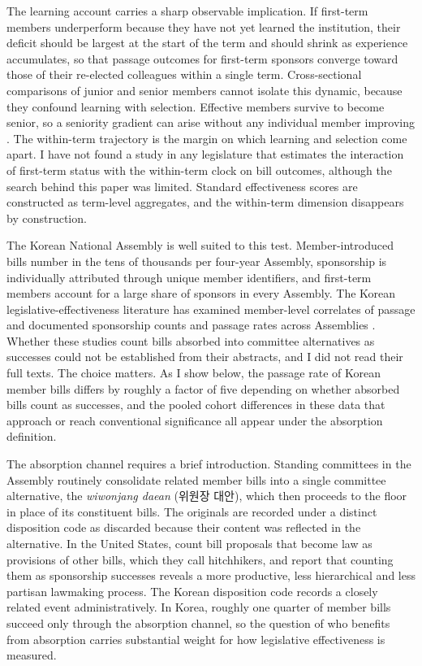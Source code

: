 \documentclass[11pt]{article}
\begin{document}
The learning account carries a sharp observable implication. If first-term members underperform because they have not yet learned the institution, their deficit should be largest at the start of the term and should shrink as experience accumulates, so that passage outcomes for first-term sponsors converge toward those of their re-elected colleagues within a single term. Cross-sectional comparisons of junior and senior members cannot isolate this dynamic, because they confound learning with selection. Effective members survive to become senior, so a seniority gradient can arise without any individual member improving \citep{padroimiquel2006}. The within-term trajectory is the margin on which learning and selection come apart. I have not found a study in any legislature that estimates the interaction of first-term status with the within-term clock on bill outcomes, although the search behind this paper was limited. Standard effectiveness scores are constructed as term-level aggregates, and the within-term dimension disappears by construction.

The Korean National Assembly is well suited to this test. Member-introduced bills number in the tens of thousands per four-year Assembly, sponsorship is individually attributed through unique member identifiers, and first-term members account for a large share of sponsors in every Assembly. The Korean legislative-effectiveness literature has examined member-level correlates of passage \citep{an2025, jeong2016} and documented sponsorship counts and passage rates across Assemblies \citep{ka2025a}. Whether these studies count bills absorbed into committee alternatives as successes could not be established from their abstracts, and I did not read their full texts. The choice matters. As I show below, the passage rate of Korean member bills differs by roughly a factor of five depending on whether absorbed bills count as successes, and the pooled cohort differences in these data that approach or reach conventional significance all appear under the absorption definition.

The absorption channel requires a brief introduction. Standing committees in the Assembly routinely consolidate related member bills into a single committee alternative, the \textit{wiwonjang daean} (위원장 대안), which then proceeds to the floor in place of its constituent bills. The originals are recorded under a distinct disposition code as discarded because their content was reflected in the alternative. In the United States, \citet{casas2020} count bill proposals that become law as provisions of other bills, which they call hitchhikers, and report that counting them as sponsorship successes reveals a more productive, less hierarchical and less partisan lawmaking process. The Korean disposition code records a closely related event administratively. In Korea, roughly one quarter of member bills succeed only through the absorption channel, so the question of who benefits from absorption carries substantial weight for how legislative effectiveness is measured.
\end{document}
